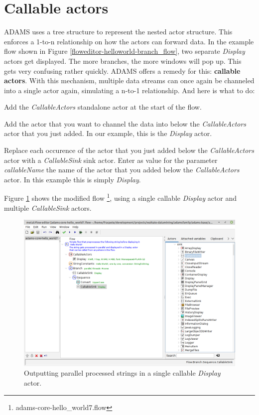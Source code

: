 \newpage
\section{Callable actors}
\label{callable_actors}
ADAMS uses a tree structure to represent the nested actor structure. This
enforces a 1-to-n relationship on how the actors can forward data. In the
example flow shown in Figure \ref{floweditor-helloworld-branch_flow}, two
separate \textit{Display} actors get displayed. The more branches, the more
windows will pop up. This gets very confusing rather quickly. ADAMS offers a
remedy for this: \textbf{callable actors}. With this mechanism, multiple data
streams can once again be channeled into a single actor again, simulating a
n-to-1 relationship. And here is what to do:
\begin{tight_itemize}
	\item Add the \textit{CallableActors} standalone actor at the start of the flow.
	\item Add the actor that you want to channel the data into below the
	\textit{CallableActors} actor that you just added. In our example, this is the
	\textit{Display} actor.
	\item Replace each occurence of the actor that you just added below the
	\textit{CallableActors} actor with a \textit{CallableSink} sink actor. Enter as
	value for the parameter \textit{callableName} the name of the actor that you
	added below the \textit{CallableActors} actor. In this example this is simply
	\textit{Display}.
\end{tight_itemize}
Figure \ref{floweditor-helloworld-callable_display} shows the modified flow
\footnote{adams-core-hello\_world7.flow}, using a single callable \textit{Display}
actor and multiple \textit{CallableSink} actors.
\begin{figure}[htb]
  \centering
  \includegraphics[width=12.0cm]{images/floweditor-helloworld-callable_display.png}
  \caption{Outputting parallel processed strings in a single callable
  \textit{Display} actor.}
  \label{floweditor-helloworld-callable_display}
\end{figure}
